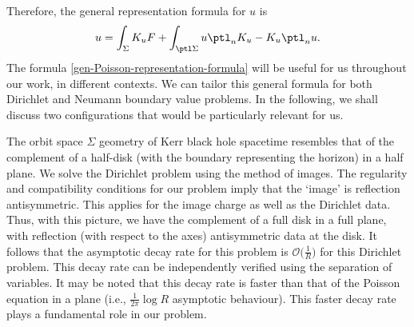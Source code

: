 Therefore, the general representation formula for $u$ is
\begin{align} \label{gen-Poisson-representation-formula}
u = \int_{\Sigma} K_u F + \int_{\ptl \Sigma} u \ptl_n K_{u} - K_{u} \ptl_n u.
\end{align}
The formula \eqref{gen-Poisson-representation-formula} will be useful for us throughout our work, in different contexts. We can tailor this general formula for both Dirichlet and Neumann boundary value problems. In the following, we shall discuss two configurations that would be particularly relevant for us.

The orbit space $\Sigma$ geometry of Kerr black hole spacetime resembles that of the complement of a half-disk (with the boundary representing the horizon) in a half plane. We solve the Dirichlet problem using the method of images. The regularity and compatibility conditions for our problem imply that the `image' is reflection antisymmetric. This applies for the image charge as well as the Dirichlet data. Thus, with this picture, we have the complement of a full disk in a full plane, with reflection (with respect to the axes) antisymmetric data at the disk. It follows that the asymptotic decay rate for this problem is $\mathcal{O} \bigl(\frac{1}{R}\bigr)$ for this Dirichlet problem. This decay rate can be independently verified using the separation of variables. It may be noted that this decay rate is faster than that of the Poisson equation in a plane \big(i.e., $\frac{1}{2 \pi} \log R$ asymptotic behaviour\big). This faster decay rate plays a fundamental role in our problem.

